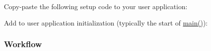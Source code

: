 \begin{DoxyCodeInclude}{0}
\end{DoxyCodeInclude}

\begin{DoxyCodeInclude}{0}
\end{DoxyCodeInclude}

\begin{DoxyCodeInclude}{0}
\end{DoxyCodeInclude}
 Copy-\/paste the following setup code to your user application\+: 
\begin{DoxyCodeInclude}{0}
\end{DoxyCodeInclude}
 Add to user application initialization (typically the start of {\ttfamily \mbox{\hyperlink{csc__app_8c_a840291bc02cba5474a4cb46a9b9566fe}{main()}}})\+: 
\begin{DoxyCodeInclude}{0}
\end{DoxyCodeInclude}
 \hypertarget{asfdoc_sam0_sercom_spi_dma_use_case_asfdoc_sam0_spi_dma_use_case_setup_flow}{}\subsubsection{Workflow}\label{asfdoc_sam0_sercom_spi_dma_use_case_asfdoc_sam0_spi_dma_use_case_setup_flow}

